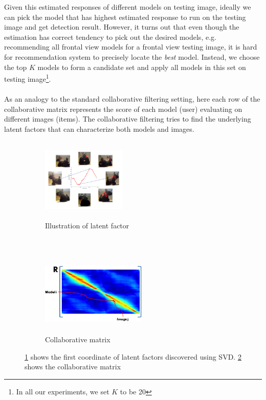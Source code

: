 \documentclass{article} %
\begin{document}
Given this estimated responses of different models on testing image, ideally we can pick the model that has highest estimated response to run on the testing image and get detection result. However, it turns out that even though the estimation has correct tendency to pick out the desired models, e.g. recommending all frontal view models for a frontal view testing image, it is hard for recommendation system to precisely locate the \emph{best} model. Instead, we choose the top $K$ models to form a candidate set and apply all models in this set on testing image\footnote{In all our experiments, we set $K$ to be 20}.\\\\
As an analogy to the standard collaborative filtering setting, here each row of the collaborative matrix represents the score of each model (user) evaluating on different images (items). The collaborative filtering tries to find the underlying latent factors that can characterize both models and images.
\begin{figure}
    \centering
        \begin{subfigure}[b]{0.3\textwidth}
                \centering
                \includegraphics[width=4cm,height=4cm]{fig/latentfactor.png}
                \caption{Illustration of latent factor}
                \label{illus:latent}
        \end{subfigure}
        ~
        \begin{subfigure}[b]{0.3\textwidth}
                \centering
                \includegraphics[width=5cm,height=4cm]{fig/matrix.jpg}
                \caption{Collaborative matrix}
                \label{illus:cm}
        \end{subfigure}%
        \caption{\ref{illus:latent} shows the first coordinate of latent factors discovered using SVD. \ref{illus:cm} shows the collaborative matrix}\label{illus}
\end{figure}
\end{document}
